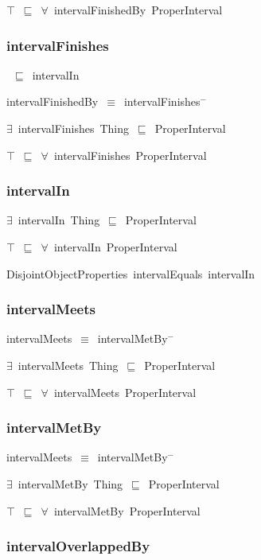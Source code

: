 \documentclass{article}
\begin{document}
\ensuremath{\top}~\ensuremath{\sqsubseteq}~\ensuremath{\forall}~intervalFinishedBy~ProperInterval

\subsubsection*{intervalFinishes}

~\ensuremath{\sqsubseteq}~intervalIn

intervalFinishedBy~\ensuremath{\equiv}~intervalFinishes\ensuremath{^-}

\ensuremath{\exists}~intervalFinishes~Thing~\ensuremath{\sqsubseteq}~ProperInterval

\ensuremath{\top}~\ensuremath{\sqsubseteq}~\ensuremath{\forall}~intervalFinishes~ProperInterval

\subsubsection*{intervalIn}

\ensuremath{\exists}~intervalIn~Thing~\ensuremath{\sqsubseteq}~ProperInterval

\ensuremath{\top}~\ensuremath{\sqsubseteq}~\ensuremath{\forall}~intervalIn~ProperInterval

DisjointObjectProperties~intervalEquals~intervalIn~

\subsubsection*{intervalMeets}

intervalMeets~\ensuremath{\equiv}~intervalMetBy\ensuremath{^-}

\ensuremath{\exists}~intervalMeets~Thing~\ensuremath{\sqsubseteq}~ProperInterval

\ensuremath{\top}~\ensuremath{\sqsubseteq}~\ensuremath{\forall}~intervalMeets~ProperInterval

\subsubsection*{intervalMetBy}

intervalMeets~\ensuremath{\equiv}~intervalMetBy\ensuremath{^-}

\ensuremath{\exists}~intervalMetBy~Thing~\ensuremath{\sqsubseteq}~ProperInterval

\ensuremath{\top}~\ensuremath{\sqsubseteq}~\ensuremath{\forall}~intervalMetBy~ProperInterval

\subsubsection*{intervalOverlappedBy}
\end{document}
